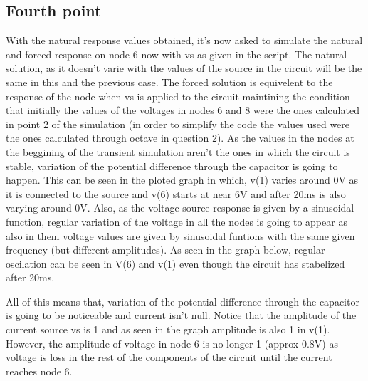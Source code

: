 

\subsection{Fourth point}
\label{ssec:4S}

\par With the natural response values obtained, it's now asked to simulate the natural and forced response on node 6 now with vs as given in the script. The natural solution, as it doesn't varie with the values of the source in the circuit will be the same in this and the previous case. The forced solution is equivelent to the response of the node when vs is applied to the circuit maintining the condition that initially the values of the voltages in nodes 6 and 8 were the ones calculated in point 2 of the simulation (in order to simplify the code the values used were the ones calculated through octave in question 2). As the values in the nodes at the beggining of the transient simulation aren't the ones in which the circuit is stable, variation of the potential difference through the capacitor is going to happen. This can be seen in the ploted graph in which, v(1) varies around 0V as it is connected to the source and v(6) starts at near 6V and after 20ms is also varying around 0V. Also, as the voltage source response is given by a sinusoidal function, regular variation of the voltage in all the nodes is going to appear as also in them voltage values are given by sinusoidal funtions with the same given frequency (but different amplitudes). As seen in the graph below, regular oscilation can be seen in V(6) and v(1) even though the circuit has stabelized after 20ms.
\par All of this means that, variation of the potential difference through the capacitor is going to be noticeable and current isn't null. Notice that the amplitude of the current source vs is 1 and as seen in the graph amplitude is also 1 in v(1). However, the amplitude of voltage in node 6 is no longer 1 (approx 0.8V) as voltage is loss in the rest of the components of the circuit until the current reaches node 6. 

